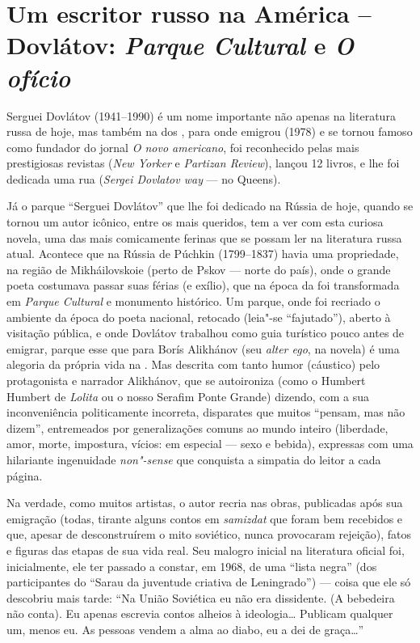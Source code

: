 \chapter{Um escritor russo na América -- Dovlátov: \emph{Parque Cultural} e \emph{O ofício}}

Serguei Dovlátov (1941--1990) é um nome importante não apenas na
literatura russa de hoje, mas também na dos , para onde emigrou (1978) e se tornou famoso como fundador do jornal \emph{O novo
americano}, foi reconhecido pelas mais prestigiosas revistas (\emph{New
Yorker} e \emph{Partizan Review}), lançou 12 livros, e lhe foi dedicada
uma rua (\emph{Sergei Dovlatov way} --- no Queens).

Já o parque ``Serguei Dovlátov'' que lhe foi dedicado na Rússia de
hoje, quando se tornou um autor icônico, entre os mais queridos, tem a
ver com esta curiosa novela, uma das mais comicamente ferinas que se
possam ler na literatura russa atual. Acontece que na Rússia de Púchkin
(1799--1837) havia uma propriedade, na região de Mikháilovskoie (perto de
Pskov --- norte do país), onde o grande poeta costumava passar suas
férias (e exílio), que na época da  foi transformada em
\emph{Parque Cultural} e monumento histórico. Um parque, onde foi
recriado o ambiente da época do poeta nacional, retocado (leia"-se
``fajutado''), aberto à visitação pública, e onde Dovlátov trabalhou
como guia turístico pouco antes de emigrar, parque esse que para Borís
Alikhánov (seu \emph{alter ego}, na novela) é uma alegoria da própria
vida na . Mas descrita com tanto humor (cáustico) pelo protagonista
e narrador Alikhánov, que se autoironiza (como o Humbert Humbert de
\emph{Lolita} ou o nosso Serafim Ponte Grande) dizendo, com a sua
inconveniência politicamente incorreta, disparates que muitos ``pensam,
mas não dizem'', entremeados por generalizações comuns ao mundo inteiro
(liberdade, amor, morte, impostura, vícios: em especial --- sexo e
bebida), expressas com uma hilariante ingenuidade \emph{non"-sense} que
conquista a simpatia do leitor a cada página.

Na verdade, como muitos artistas, o autor recria nas obras, publicadas
após sua emigração (todas, tirante alguns contos em \emph{samizdat} que
foram bem recebidos e que, apesar de desconstruírem o mito soviético,
nunca provocaram rejeição), fatos e figuras das etapas de sua vida
real. Seu malogro inicial na literatura oficial foi, inicialmente, ele
ter passado a constar, em 1968, de uma ``lista negra'' (dos
participantes do ``Sarau da juventude criativa de Leningrado'') --- coisa
que ele só descobriu mais tarde: ``Na União Soviética eu não era
dissidente. (A bebedeira não conta). Eu apenas escrevia contos alheios à
ideologia\ldots{} Publicam qualquer um, menos eu. As pessoas vendem a alma ao
diabo, eu a dei de graça\ldots{}''

